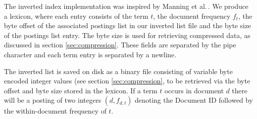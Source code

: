 The inverted index implementation was inspired by Manning et al.\,\cite{manning2008introduction}. We produce a lexicon, where each entry consists of the term $t$, the document frequency $f_t$, the byte offset of the associated postings list in our inverted list file and the byte size of the postings list entry. The byte size is used for retrieving compressed data, as discussed in section \ref{sec:compression}. These fields are separated by the pipe character and each term entry is separated by a newline.

The inverted list is saved on disk as a binary file consisting of variable byte encoded integer values (see section \ref{sec:compression}, to be retrieved via the byte offset and byte size stored in the lexicon. If a term $t$ occurs in document $d$ there will be a posting of two integers $(d, f_{d,t})$ denoting the Document ID followed by the within-document frequency of $t$.

